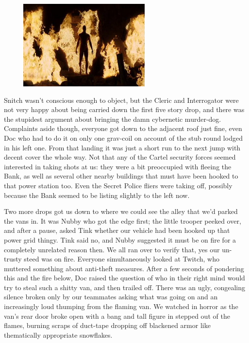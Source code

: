 \begin{figure}
	\begin{center}
		\includegraphics[width=\figwidth]{pics/18/36.png}
	\end{center}
\end{figure}
Snitch wasn't conscious enough to object, but the Cleric and Interrogator were not very happy about being carried down the first five story drop, and there was the stupidest argument about bringing the damn cybernetic murder-dog. 
Complaints aside though, everyone got down to the adjacent roof just fine, even Doc who had to do it on only one grav-coil on account of the stub round lodged in his left one. 
From that landing it was just a short run to the next jump with decent cover the whole way. 
Not that any of the Cartel security forces seemed interested in taking shots at us: 
they were a bit preoccupied with fleeing the Bank, as well as several other nearby buildings that must have been hooked to that power station too. 
Even the Secret Police fliers were taking off, possibly because the Bank seemed to be listing slightly to the left now.

Two more drops got us down to where we could see the alley that we'd parked the vans in. 
It was Nubby who got the edge first; 
the little trooper peeked over, and after a pause, asked Tink whether our vehicle had been hooked up that power grid thingy. 
Tink said no, and Nubby suggested it must be on fire for a completely unrelated reason then. 
We all ran over to verify that, yes our un-trusty steed was on fire. 
Everyone simultaneously looked at Twitch, who muttered something about anti-theft measures. 
After a few seconds of pondering this and the fire below, Doc raised the question of who in their right mind would try to steal such a shitty van, and then trailed off. 
There was an ugly, congealing silence broken only by our teammates asking what was going on and an increasingly loud thumping from the flaming van. 
We watched in horror as the van's rear door broke open with a bang and tall figure in  stepped out of the flames, burning scraps of duct-tape dropping off blackened armor like thematically appropriate snowflakes. 


